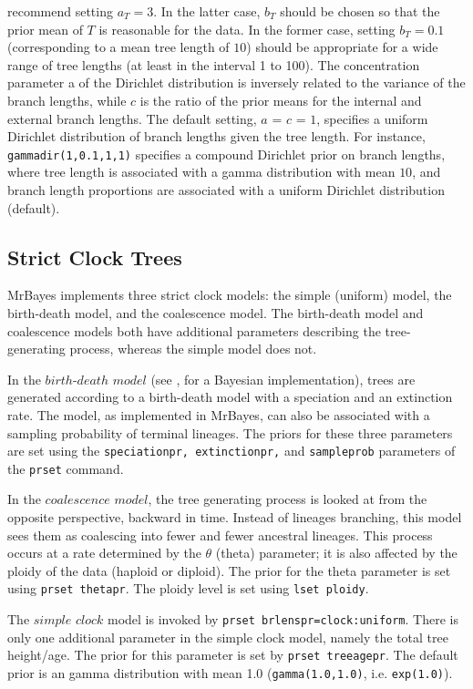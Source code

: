 \documentclass[12pt]{book}
\begin{document}
recommend setting $a_{T} = 3$. In the latter case, $b_{T}$ should be chosen so that the prior mean
of $T$ is reasonable for the data. In the former case, setting $b_{T} = 0.1$ (corresponding to a
mean tree length of $10$) should be appropriate for a wide range of tree lengths (at least in the
interval 1 to 100). The concentration parameter a of the Dirichlet distribution is inversely
related to the variance of the branch lengths, while $c$ is the ratio of the prior means for the
internal and external branch lengths. The default setting, $a$ = $c$ = $1$, specifies a uniform
Dirichlet distribution of branch lengths given the tree length. For instance,
\texttt{gammadir(1,0.1,1,1)} specifies a compound Dirichlet prior on branch lengths, where tree
length is associated with a gamma distribution with mean $10$, and branch length proportions are
associated with a uniform Dirichlet distribution (default).

\subsection{Strict Clock Trees}

MrBayes implements three strict clock models: the simple (uniform) model, the birth-death model,
and the coalescence model. The birth-death model and coalescence models both have additional
parameters describing the tree-generating process, whereas the simple model does not.

In the $birth$-$death$ $model$ (see \citet{yang97b}, for a Bayesian implementation), trees are
generated according to a birth-death model with a speciation and an extinction rate. The model, as
implemented in MrBayes, can also be associated with a sampling probability of terminal lineages.
The priors for these three parameters are set using the \texttt{speciationpr, extinctionpr,} and
\texttt{sampleprob} parameters of the \texttt{prset} command.

In the $coalescence$ $model$, the tree generating process is looked at from the opposite
perspective, backward in time. Instead of lineages branching, this model sees them as coalescing
into fewer and fewer ancestral lineages. This process occurs at a rate determined by the $\theta$
(theta) parameter; it is also affected by the ploidy of the data (haploid or diploid). The prior
for the theta parameter is set using \texttt{prset thetapr}. The ploidy level is set using
\texttt{lset ploidy}.

The $simple$ $clock$ model is invoked by \texttt{prset brlenspr=clock:uniform}. There is only one
additional parameter in the simple clock model, namely the total tree height/age. The prior for
this parameter is set by \texttt{prset treeagepr}. The default prior is an gamma distribution with
mean 1.0 (\texttt{gamma(1.0,1.0)}, i.e. \texttt{exp(1.0)}).
\end{document}

